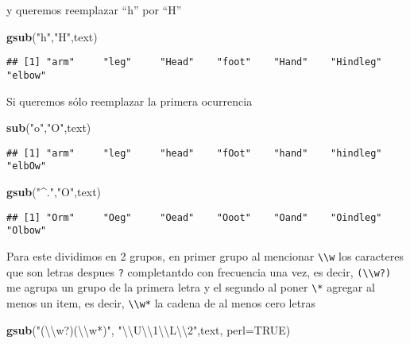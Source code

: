 \documentclass[]{article}
\newenvironment{Shaded}{\begin{snugshade}}{\end{snugshade}}
\newcommand{\KeywordTok}[1]{\textcolor[rgb]{0.13,0.29,0.53}{\textbf{#1}}}
\newcommand{\DataTypeTok}[1]{\textcolor[rgb]{0.13,0.29,0.53}{#1}}
\newcommand{\CharTok}[1]{\textcolor[rgb]{0.31,0.60,0.02}{#1}}
\newcommand{\StringTok}[1]{\textcolor[rgb]{0.31,0.60,0.02}{#1}}
\newcommand{\OtherTok}[1]{\textcolor[rgb]{0.56,0.35,0.01}{#1}}
\newcommand{\NormalTok}[1]{#1}
\begin{document}
y queremos reemplazar ``h'' por ``H''

\begin{Shaded}
\begin{Highlighting}[]
\KeywordTok{gsub}\NormalTok{(}\StringTok{"h"}\NormalTok{,}\StringTok{"H"}\NormalTok{,text)}
\end{Highlighting}
\end{Shaded}

\begin{verbatim}
## [1] "arm"     "leg"     "Head"    "foot"    "Hand"    "Hindleg" "elbow"
\end{verbatim}

Si queremos sólo reemplazar la primera ocurrencia

\begin{Shaded}
\begin{Highlighting}[]
\KeywordTok{sub}\NormalTok{(}\StringTok{"o"}\NormalTok{,}\StringTok{"O"}\NormalTok{,text)}
\end{Highlighting}
\end{Shaded}

\begin{verbatim}
## [1] "arm"     "leg"     "head"    "fOot"    "hand"    "hindleg" "elbOw"
\end{verbatim}

\begin{Shaded}
\begin{Highlighting}[]
\KeywordTok{gsub}\NormalTok{(}\StringTok{"^."}\NormalTok{,}\StringTok{"O"}\NormalTok{,text)}
\end{Highlighting}
\end{Shaded}

\begin{verbatim}
## [1] "Orm"     "Oeg"     "Oead"    "Ooot"    "Oand"    "Oindleg" "Olbow"
\end{verbatim}

Para este dividimos en 2 grupos, en primer grupo al mencionar
\texttt{\textbackslash{}\textbackslash{}w} los caracteres que son letras
despues \texttt{?} completantdo con frecuencia una vez, es decir,
\texttt{(\textbackslash{}\textbackslash{}w?)} me agrupa un grupo de la
primera letra y el segundo al poner \texttt{\textbackslash{}*} agregar
al menos un item, es decir, \texttt{\textbackslash{}\textbackslash{}w*}
la cadena de al menos cero letras

\begin{Shaded}
\begin{Highlighting}[]
\KeywordTok{gsub}\NormalTok{(}\StringTok{"(}\CharTok{\textbackslash{}\textbackslash{}}\StringTok{w?)(}\CharTok{\textbackslash{}\textbackslash{}}\StringTok{w*)"}\NormalTok{, }\StringTok{"}\CharTok{\textbackslash{}\textbackslash{}}\StringTok{U}\CharTok{\textbackslash{}\textbackslash{}}\StringTok{1}\CharTok{\textbackslash{}\textbackslash{}}\StringTok{L}\CharTok{\textbackslash{}\textbackslash{}}\StringTok{2"}\NormalTok{,text, }\DataTypeTok{perl=}\OtherTok{TRUE}\NormalTok{)}
\end{Highlighting}
\end{Shaded}
\end{document}

